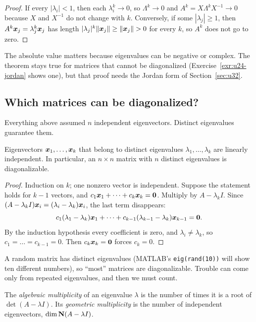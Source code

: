 \begin{proof}
If every $|\lambda_i|<1$, then each $\lambda_i^{k}\to0$, so $\Lambda^{k}\to0$ and
$A^{k}=X\Lambda^{k}X^{-1}\to0$ because $X$ and $X^{-1}$ do not change with $k$. Conversely,
if some $|\lambda_j|\ge1$, then $A^{k}\boldsymbol{x}_j=\lambda_j^{k}\boldsymbol{x}_j$ has length
$|\lambda_j|^{k}\|\vb{x}_j\|\ge\|\vb{x}_j\|>0$ for every $k$, so $A^{k}$ does not go to zero.
\end{proof}

The absolute value matters because eigenvalues can be negative or complex. The theorem stays
true for matrices that cannot be diagonalized (Exercise~\ref{exr:u24-jordan} shows one), but
that proof needs the Jordan form of Section~\ref{sec:u32}.

\subsection{Which matrices can be diagonalized?}

Everything above assumed $n$ independent eigenvectors. Distinct eigenvalues guarantee them.

\begin{theorem}\label{thm:u24-distinct}
Eigenvectors $\boldsymbol{x}_1,\dots,\boldsymbol{x}_k$ that belong to distinct eigenvalues
$\lambda_1,\dots,\lambda_k$ are linearly independent. In particular, an $n\times n$ matrix
with $n$ distinct eigenvalues is diagonalizable.
\end{theorem}

\begin{proof}
Induction on $k$; one nonzero vector is independent. Suppose the statement holds for $k-1$
vectors, and $c_1\boldsymbol{x}_1+\dots+c_k\boldsymbol{x}_k=\boldsymbol{0}$. Multiply by $A-\lambda_kI$. Since
$(A-\lambda_kI)\boldsymbol{x}_i=(\lambda_i-\lambda_k)\boldsymbol{x}_i$, the last term disappears:
\[
  c_1(\lambda_1-\lambda_k)\boldsymbol{x}_1+\dots+c_{k-1}(\lambda_{k-1}-\lambda_k)\boldsymbol{x}_{k-1}=\boldsymbol{0}.
\]
By the induction hypothesis every coefficient is zero, and $\lambda_i\neq\lambda_k$, so
$c_1=\dots=c_{k-1}=0$. Then $c_k\boldsymbol{x}_k=\boldsymbol{0}$ forces $c_k=0$.
\end{proof}

A random matrix has distinct eigenvalues (MATLAB's \texttt{eig(rand(10))} will show ten
different numbers), so ``most'' matrices are diagonalizable. Trouble can come only from
repeated eigenvalues, and then we must count.

\begin{definition}\label{def:u24-mult}
The \emph{algebraic multiplicity} of an eigenvalue $\lambda$ is the number of times it is a
root of $\det(A-\lambda I)$. Its \emph{geometric multiplicity} is the number of independent
eigenvectors, $\dim\mathbf{N}(A-\lambda I)$.
\end{definition}

